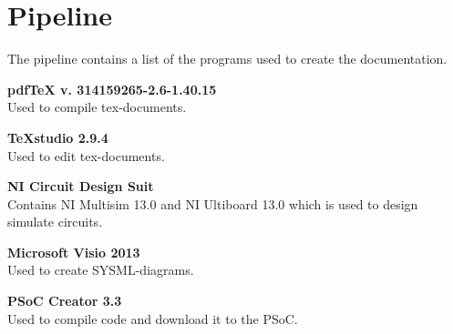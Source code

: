 \section{Pipeline}
The pipeline contains a list of the programs used to create the documentation.

\textbf{pdfTeX v. 314159265-2.6-1.40.15}\\
Used to compile tex-documents.

\textbf{TeXstudio 2.9.4}\\
Used to edit tex-documents.

\textbf{NI Circuit Design Suit}\\
Contains NI Multisim 13.0 and NI Ultiboard 13.0 which is used to design simulate circuits.

\textbf{Microsoft Visio 2013}\\
Used to create SYSML-diagrams.

\textbf{PSoC Creator 3.3}\\
Used to compile code and download it to the PSoC.

